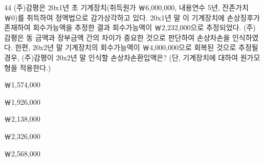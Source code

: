 \begin{question}{44}
(주)감평은 20x1년 초 기계장치(취득원가 ￦6,000,000, 내용연수 5년, 잔존가치 ￦0)를 취득하여 정액법으로 감가상각하고 있다. 20x1년 말 이 기계장치에 손상징후가 존재하여 회수가능액을 추정한 결과 회수가능액이 ￦2,232,000으로 추정되었다. (주)감평은 동 금액과 장부금액 간의 차이가 중요한 것으로 판단하여 손상차손을 인식하였다. 한편, 20x2년 말 기계장치의 회수가능액이 ￦4,000,000으로 회복된 것으로 추정될 경우, (주)감평이 20x2년 말 인식할 손상차손환입액은? (단, 기계장치에 대하여 원가모형을 적용한다.)
\begin{choices}
  \item ￦1,574,000
  \item ￦1,926,000
  \item ￦2,138,000
  \item ￦2,326,000
  \item ￦2,568,000
\end{choices}
\end{question}
